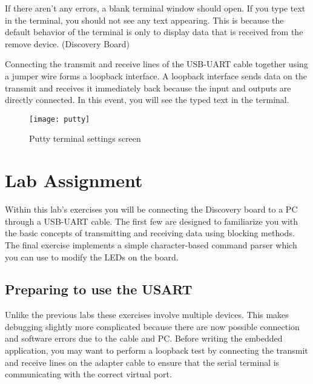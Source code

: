 \documentclass[openany,11pt,fleqn]{book} %
\begin{document}
If there aren't any errors, a blank terminal window should open. If you type text in the terminal, you should not see any text appearing. This is because the default behavior of the terminal is only to display data that is received from the remove device. (Discovery Board) 

Connecting the transmit and receive lines of the USB-UART cable together using a jumper wire forms a loopback interface. A loopback interface sends data on the transmit and receives it immediately back because the input and outputs are directly connected. In this event, you will see the typed text in the terminal. 

\begin{figure}[]
    \centering\texttt{[image: putty]}
    \caption{Putty terminal settings screen}
    \label{putty}
\end{figure}



\section{\color{blue}Lab Assignment}
Within this lab's exercises you will be connecting the Discovery board to a PC through a USB-UART cable. The first few are designed to familiarize you with the basic concepts of transmitting and receiving data using blocking methods. The final exercise implements a simple character-based command parser which you can use to modify the LEDs on the board.  

\subsection{Preparing to use the USART} 
Unlike the previous labs these exercises involve multiple devices. This makes debugging slightly more complicated because there are now possible connection and software errors due to the cable and PC. Before writing the embedded application, you may want to perform a loopback test by connecting the transmit and receive lines on the adapter cable to ensure that the serial terminal is communicating with the correct virtual port. 
\end{document}
